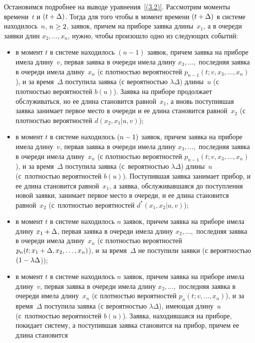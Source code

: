 \begin{multicols}{2}
Остановимся подробнее на выводе уравнения~\eqref{(3.2)}.
Рассмотрим моменты времени~$t$ и $(t\hm+\Delta)$.
Тогда для того чтобы в момент времени
$(t\hm+\Delta)$ в системе
находилось~$n$, $n\hm\ge 2$, заявок, причем
на приборе заявка длины~$x_1$, а в очереди
заявки длин $x_2,\ldots,x_n$, нужно, чтобы
произошло одно из следующих событий:
\begin{itemize}
\item
в момент $t$ в системе находилось $(n-1)$
заявок, причем заявка на приборе имела
длину~$v$, первая заявка в очереди имела
длину $x_3,\ldots,$ последняя заявка в очереди
\mbox{имела} длину~$x_n$ (с плотностью
вероятностей $p_{n-1}(t;v,x_3,\ldots,x_n)$),
и за время~$\Delta$ поступила заявка
(с вероятностью $\lambda\Delta$) длины~$u$
(с плотностью вероятностей $b(u)$).
Заявка на приборе продолжает обслуживаться,
но ее длина становится равной~$x_1$, а вновь
поступившая заявка занимает первое место в
очереди и ее длина становится равной~$x_2$
(с плотностью вероятностей $d(x_2,x_1|u,v)$);
\item
в момент $t$ в системе находилось $(n\hm-1)$
заявок, причем заявка на приборе имела
длину~$v$, первая заявка в очереди имела
длину $x_3,\ldots,$ последняя заявка в
очереди \mbox{имела} длину~$x_n$ (с плот\-ностью
вероятностей $p_{n-1}(t;v,x_3,\ldots,x_n)$),
и за время~$\Delta$ поступила заявка
(с~вероятностью $\lambda\Delta$) длины~$u$
(с~плот\-ностью вероятностей $b(u)$).
Поступившая заявка занимает прибор, и ее длина
становится равной~$x_1$, а заявка,
обслуживавшаяся до поступления новой заявки,
занимает первое мес\-то в очереди, и ее длина
становится равной~$x_2$ (с~плот\-ностью
вероятностей $d^*(x_1,x_2|u,v)$);
\item
в момент $t$ в сис\-те\-ме находилось $n$ заявок,
причем заявка на приборе имела
длину $x_1\hm+\Delta$, первая заявка в очереди
имела длину $x_2,\ldots,$ последняя заявка в
очереди имела длину~$x_n$ (с плотностью
вероятностей
$p_n(t;x_1\hm+\Delta,x_2,\ldots,x_n)$), и за
время~$\Delta$ не поступили заявки (с
вероятностью $(1\hm-\lambda\Delta$));
\item
в момент $t$ в сис\-те\-ме находилось $n$ заявок,
причем заявка на приборе имела длину~$v$,
первая заявка в очереди имела длину
$x_2,\ldots,$ последняя заявка в очереди
имела длину~$x_n$ (с плот\-ностью
вероятностей $p_n(t;v,\ldots,x_n)$), и за время~$\Delta$ поступила заявка (с вероятностью
$\lambda\Delta$), име\-ющая длину~$u$
(с~плот\-ностью вероятностей $b(u)$).
Заявка, находившаяся на приборе, покидает
сис\-те\-му, а поступившая заявка становится на
прибор, причем ее длина становится

\end{itemize}
\end{multicols}
